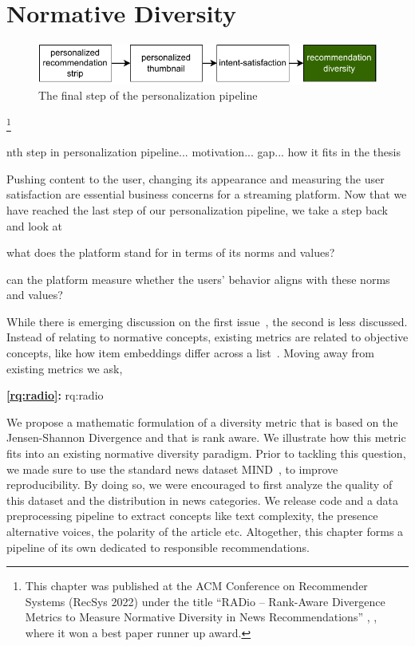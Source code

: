 \chapter{Normative Diversity}
\label{chapter:research-radio}

\begin{figure}[ht]
  \centering
  \includegraphics{images/pipeline_step4.pdf}
  \caption{The final step of the personalization pipeline}
  \label{fig:pip4}
\end{figure}

\footnote[]{This chapter was published at the ACM Conference on Recommender Systems (RecSys 2022) under the title ``RADio – Rank-Aware Divergence Metrics to Measure Normative Diversity in News Recommendations'' \citep{radio}, , where it won a best paper runner up award.}
\acresetall

nth step in personalization pipeline...
motivation...
gap...
how it fits in the thesis
\fi

Pushing content to the user, changing its appearance and measuring the user satisfaction are essential business concerns for a streaming platform. Now that we have reached the last step of our personalization pipeline, we take a step back and look at
\begin{enumerate*}[label={(\roman*)}]
\item what does the platform stand for in terms of its norms and values?
\item can the platform measure whether the users' behavior aligns with these norms and values?
\end{enumerate*}
While there is emerging discussion on the first issue~\cite{helberger, normalize, fairChatGPTReco}, the second is less discussed. Instead of relating to normative concepts, existing metrics are related to objective concepts, like how item embeddings differ across a list~\cite{liang2021ILD}. Moving away from existing metrics we ask,

\medskip
\noindent
\textbf{\ref{rq:radio}:} \acl{rq:radio}
\medskip

We propose a mathematic formulation of a diversity metric that is based on the Jensen-Shannon Divergence and that is rank aware. We illustrate how this metric fits into an existing normative diversity paradigm. Prior to tackling this question, we made sure to use the standard news dataset MIND~\cite{wu2020mind}, to improve reproducibility. By doing so, we were encouraged to first analyze the quality of this dataset and the distribution in news categories. We release code and a data preprocessing pipeline to extract concepts like text complexity, the presence alternative voices, the polarity of the article etc. Altogether, this chapter forms a pipeline of its own dedicated to responsible recommendations.




